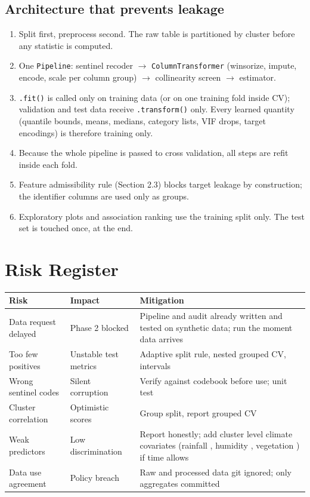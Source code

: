 \documentclass[11pt,a4paper]{article}
\begin{document}
\subsection{Architecture that prevents leakage}
\begin{enumerate}
\item Split first, preprocess second. The raw table is partitioned by cluster before any statistic is computed.
\item One \texttt{Pipeline}: sentinel recoder $\rightarrow$ \texttt{ColumnTransformer} (winsorize, impute, encode, scale per column group) $\rightarrow$ collinearity screen $\rightarrow$ estimator.
\item \texttt{.fit()} is called only on training data (or on one training fold inside CV); validation and test data receive \texttt{.transform()} only. Every learned quantity (quantile bounds, means, medians, category lists, VIF drops, target encodings) is therefore training only.
\item Because the whole pipeline is passed to cross validation, all steps are refit inside each fold.
\item Feature admissibility rule (Section 2.3) blocks target leakage by construction; the identifier columns are used only as groups.
\item Exploratory plots and association ranking use the training split only. The test set is touched once, at the end.
\end{enumerate}

\section{Risk Register}
\begin{center}\small
\begin{tabular}{@{}p{4.1cm}p{4.3cm}p{5.9cm}@{}}\toprule
Risk & Impact & Mitigation\\\midrule
Data request delayed & Phase 2 blocked & Pipeline and audit already written and tested on synthetic data; run the moment data arrives\\
Too few positives & Unstable test metrics & Adaptive split rule, nested grouped CV, intervals\\
Wrong sentinel codes & Silent corruption & Verify against codebook before use; unit test\\
Cluster correlation & Optimistic scores & Group split, report grouped CV\\
Weak predictors & Low discrimination & Report honestly; add cluster level climate covariates (rainfall \cite{funk2015}, humidity \cite{munozsabater2021}, vegetation \cite{didan2020}) if time allows\\
Data use agreement & Policy breach & Raw and processed data git ignored; only aggregates committed\\\bottomrule
\end{tabular}\end{center}
\end{document}
